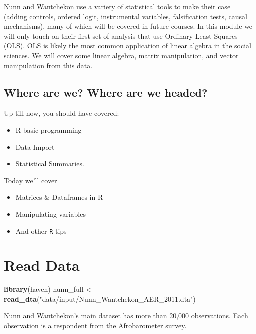 \documentclass[]{book}
\newenvironment{Shaded}{\begin{snugshade}}{\end{snugshade}}
\newcommand{\KeywordTok}[1]{\textcolor[rgb]{0.13,0.29,0.53}{\textbf{#1}}}
\newcommand{\NormalTok}[1]{#1}
\newcommand{\StringTok}[1]{\textcolor[rgb]{0.31,0.60,0.02}{#1}}
\providecommand{\tightlist}{%
  \setlength{\itemsep}{0pt}\setlength{\parskip}{0pt}}
\theoremstyle{definition}
\theoremstyle{definition}
\theoremstyle{definition}
\theoremstyle{remark}
\begin{document}
Nunn and Wantchekon use a variety of statistical tools to make their case (adding controls, ordered logit, instrumental variables, falsification tests, causal mechanisms), many of which will be covered in future courses. In this module we will only touch on their first set of analysis that use Ordinary Least Squares (OLS). OLS is likely the most common application of linear algebra in the social sciences. We will cover some linear algebra, matrix manipulation, and vector manipulation from this data.

\hypertarget{where-are-we-where-are-we-headed-1}{%
\subsection*{Where are we? Where are we headed?}\label{where-are-we-where-are-we-headed-1}}

Up till now, you should have covered:

\begin{itemize}
\tightlist
\item
  R basic programming
\item
  Data Import
\item
  Statistical Summaries.
\end{itemize}

Today we'll cover

\begin{itemize}
\tightlist
\item
  Matrices \& Dataframes in R
\item
  Manipulating variables
\item
  And other \texttt{R} tips
\end{itemize}

\hypertarget{read-data-1}{%
\section{Read Data}\label{read-data-1}}

\begin{Shaded}
\begin{Highlighting}[]
\KeywordTok{library}\NormalTok{(haven)}
\NormalTok{nunn\_full <{-}}\StringTok{ }\KeywordTok{read\_dta}\NormalTok{(}\StringTok{"data/input/Nunn\_Wantchekon\_AER\_2011.dta"}\NormalTok{)}
\end{Highlighting}
\end{Shaded}

Nunn and Wantchekon's main dataset has more than 20,000 observations. Each observation is a respondent from the Afrobarometer survey.
\end{document}

